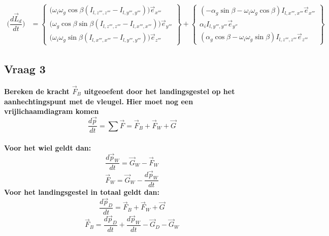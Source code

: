 \documentclass[a4paper,10pt]{article}
\begin{document}
\begin{equation}
	\begin{aligned}
	\Big(\dfrac{d\vec{L}_d}{dt}\Big) &= \begin{Bmatrix}
	\Big( \omega_i \omega_g\cos{\beta} (I_{l,z''',z'''} - I_{l,y''',y'''}) \Big) \vec{e}_{x'''}\\
	\Big(\omega_g\cos{\beta}\sin{\beta}(I_{l,z''',z'''} - I_{l,x''',x'''})\Big) \vec{e}_{y'''} \\
	\Big(\omega_i \omega_g\sin{\beta}(I_{l,x''',x'''} - I_{l,y''',y'''})\Big)\vec{e}_{z'''}
	\end{Bmatrix} + \begin{Bmatrix}
	(-\alpha_g \sin{\beta} - \omega_i\omega_g\cos{\beta})I_{l,x''',x'''}\vec{e}_{x'''}\\
	\alpha_iI_{l,y''',y'''}\vec{e}_{y''}\\
	(\alpha_g\cos{\beta}-\omega_i\omega_g\sin{\beta})I_{l,z''',z'''}\vec{e}_{z'''}
	\end{Bmatrix}
	\end{aligned}
\end{equation}
\subsection{Vraag 3}
\textbf{Bereken de kracht $\vec{F}_B$ uitgeoefent door het landingsgestel op het aanhechtingspunt met de vleugel.}
\textbf{{\Large Hier moet nog een vrijlichaamdiagram komen}}
\begin{equation}
\dfrac{d\vec{p}}{dt} = \sum	\vec{F}	= \vec{F}_B + \vec{F}_W + \vec{G}
\end{equation}\\
\textbf{Voor het wiel geldt dan:}
\begin{equation}
\dfrac{d\vec{p}_W}{dt} = \vec{G}_W -\vec{F}_W
\end{equation}
\begin{equation}
\vec{F}_W = \vec{G}_W - \dfrac{d\vec{p}_W}{dt}
\end{equation}
\textbf{Voor het landingsgestel in totaal geldt dan:}
\begin{equation}
\dfrac{d\vec{p}_D}{dt} 	= \vec{F}_B + \vec{F}_W + \vec{G}
\end{equation}
\begin{equation}
\vec{F}_B = \dfrac{d\vec{p}_D}{dt} + \dfrac{d\vec{p}_W}{dt} - \vec{G}_D - \vec{G}_W
\end{equation}
\end{document}
